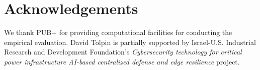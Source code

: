 \documentclass[runningheads]{llncs}
\begin{document}
\section*{Acknowledgements}

We thank PUB+ for providing computational facilities for
conducting the empirical evaluation. David Tolpin is partially
supported by Israel-U.S. Industrial Research and Development
Foundation's \textit{Cybersecurity technology for critical power
infrastructure AI-based centralized defense and edge resilience}
project.

\nocite{BDS21}
\nocite{CPK+18}
\nocite{SYG+19}
\nocite{KC18}
\nocite{LKW16}
\nocite{BRH15}
\nocite{AV20}
\nocite{FSK+16}
\nocite{MFS+21}
\nocite{FSP+16}
\nocite{SZN+19}
\nocite{LYY+19}
\nocite{CYP+21}
\nocite{YB21}
\nocite{CKD+15}
\nocite{HS97}
\nocite{CMB+14}
\nocite{WSY+21}



\end{document}
